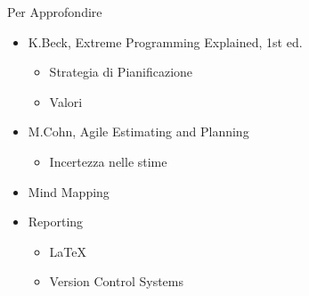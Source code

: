 \documentclass[compress, red, 14pt]{beamer}
\begin{document}
	\begin{frame}{Per Approfondire}
		\begin{itemize}
			\item {\small K.Beck, Extreme Programming Explained, 1st ed.}
			\begin{itemize}
				\item Strategia di Pianificazione
				\item Valori
			\end{itemize}
			\item {\small M.Cohn, Agile Estimating and Planning}
			\begin{itemize}
				\item Incertezza nelle stime
			\end{itemize}
			\item Mind Mapping
			\item Reporting
			\begin{itemize}
				\item LaTeX
				\item Version Control Systems
			\end{itemize}
		\end{itemize}
	\end{frame}
\end{document}
